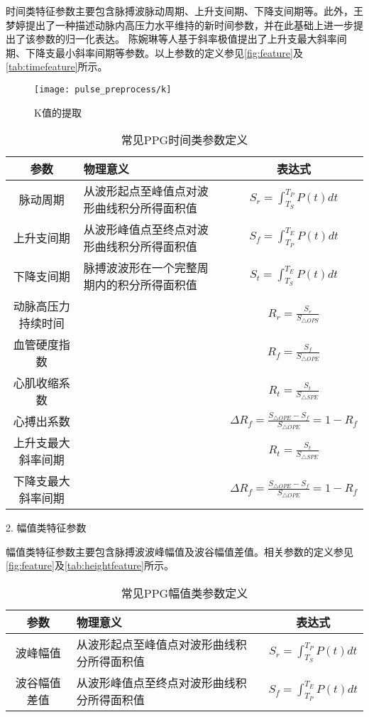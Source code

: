 时间类特征参数主要包含脉搏波脉动周期、上升支间期、下降支间期等。此外，王梦婷提出了一种描述动脉内高压力水平维持的新时间参数，并在此基础上进一步提出了该参数的归一化表达\cite{mmt}。
陈婉琳等人基于斜率极值提出了上升支最大斜率间期、下降支最小斜率间期等参数\cite{cwl}。以上参数的定义参见\autoref{fig:feature}及\autoref{tab:timefeature}所示。
\begin{figure}[htbp]
    \centering
    \texttt{[image: pulse\_preprocess/k]}
    \caption{\label{fig:feature}K值的提取}
\end{figure}
\begin{table}[h]
    \centering
    \caption{\label{tab:timefeature}常见PPG时间类参数定义}
    \begin{tabularx}{\linewidth}{cX<{\centering}c}
    \toprule
    \textbf{参数} & \textbf{物理意义} & \textbf{表达式} \\
    \midrule
    脉动周期      &  从波形起点至峰值点对波形曲线积分所得面积值         &  $S_r=\int_{T_S}^{T_P}P(t)dt$\\
    上升支间期      &  从波形峰值点至终点对波形曲线积分所得面积值         &  $S_f=\int_{T_P}^{T_E}P(t)dt$\\
    下降支间期      &  脉搏波波形在一个完整周期内的积分所得面积值         &  $S_t=\int_{T_S}^{T_E}P(t)dt$\\
    动脉高压力持续时间    &           &   $R_r=\frac{S_r}{S_{\triangle OPS}}$    \\
    血管硬度指数    &           &   $R_f=\frac{S_f}{S_{\triangle OPE}}$    \\
    心肌收缩系数    &           &   $R_t=\frac{S_t}{S_{\triangle SPE}}$    \\
    心搏出系数&           &    $\Delta R_f=\frac{S_{\triangle OPE}-S_f}{S_{\triangle OPE}}=1-R_f$\\
    上升支最大斜率间期    &           &   $R_t=\frac{S_t}{S_{\triangle SPE}}$    \\
    下降支最大斜率间期&           &    $\Delta R_f=\frac{S_{\triangle OPE}-S_f}{S_{\triangle OPE}}=1-R_f$\\
    \bottomrule
    \end{tabularx}
\end{table}

2. 幅值类特征参数

幅值类特征参数主要包含脉搏波波峰幅值及波谷幅值差值。相关参数的定义参见\autoref{fig:feature}及\autoref{tab:heightfeature}所示。
\begin{table}[htbp]
    \centering
    \caption{\label{tab:heightfeature}常见PPG幅值类参数定义}
    \begin{tabularx}{\linewidth}{cX<{\centering}c}
    \toprule
    \textbf{参数} & \textbf{物理意义} & \textbf{表达式} \\
    \midrule
    波峰幅值      &  从波形起点至峰值点对波形曲线积分所得面积值         &  $S_r=\int_{T_S}^{T_P}P(t)dt$\\
    波谷幅值差值      &  从波形峰值点至终点对波形曲线积分所得面积值         &  $S_f=\int_{T_P}^{T_E}P(t)dt$\\
    \bottomrule
    \end{tabularx}
\end{table}

